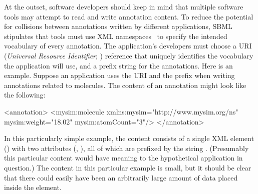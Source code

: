 At the outset, software developers should keep in mind that
multiple software tools may attempt to read and write annotation
content.  To reduce the potential for collisions between
annotations written by different applications, SBML \thisLV
stipulates that tools must use XML namespaces~\citep{bray:1999} to
specify the intended vocabulary of every annotation.  The
application's developers must choose a URI (\emph{Universal
  Resource Identifier}; \citealt{harold:2001,w3c:2000}) reference
that uniquely identifies the vocabulary the application will use,
and a prefix string for the annotations.  Here is an example.
Suppose an application uses the URI 
and the prefix  when writing annotations related to 
molecules.  The content of an annotation might look like the
following:

\begin{example}
<annotation>
    <mysim:molecule xmlns:mysim="http://www.mysim.org/ns"
         mysim:weight="18.02" mysim:atomCount="3"/>
</annotation>
\end{example}

In this particularly simple example, the content consists of a single
XML element () with two attributes
(, ), all of which are prefixed by
the string .  (Presumably this particular content
would have meaning to the hypothetical application in question.)
The content in this particular example is small, but it should be
clear that there could easily have been an arbitrarily large
amount of data placed inside the  element.

